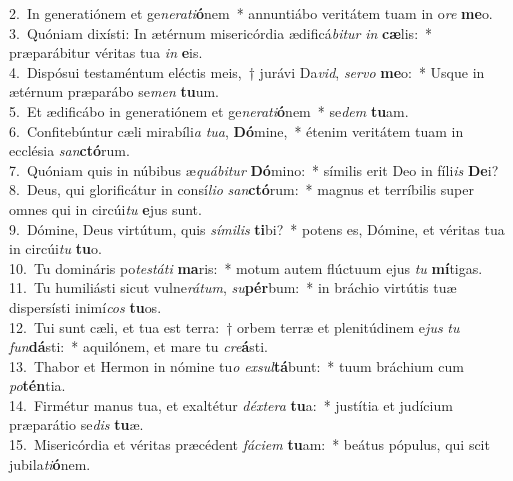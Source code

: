 {2.~}In generatiónem et ge\textit{ne}\textit{ra}\textit{ti}\textbf{ó}nem~* annuntiábo veritátem tuam in o\textit{re} \textbf{me}o.\\
{3.~}Quóniam dixísti: In ætérnum misericórdia ædificá\textit{bi}\textit{tur} \textit{in} \textbf{cæ}lis:~* præparábitur véritas tua \textit{in} \textbf{e}is.\\
{4.~}Dispósui testaméntum eléctis meis,~† jurávi Da\textit{vid}, \textit{ser}\textit{vo} \textbf{me}o:~* Usque in ætérnum præparábo se\textit{men} \textbf{tu}um.\\
{5.~}Et ædificábo in generatiónem et ge\textit{ne}\textit{ra}\textit{ti}\textbf{ó}nem~* se\textit{dem} \textbf{tu}am.\\
{6.~}Confitebúntur cæli mirabíli\textit{a} \textit{tu}\textit{a}, \textbf{Dó}mine,~* étenim veritátem tuam in ecclésia \textit{san}\textbf{ctó}rum.\\
{7.~}Quóniam quis in núbibus æ\textit{quá}\textit{bi}\textit{tur} \textbf{Dó}mino:~* símilis erit Deo in fíli\textit{is} \textbf{De}i?\\
{8.~}Deus, qui glorificátur in consí\textit{li}\textit{o} \textit{san}\textbf{ctó}rum:~* magnus et terríbilis super omnes qui in circúi\textit{tu} \textbf{e}jus sunt.\\
{9.~}Dómine, Deus virtútum, quis \textit{sí}\textit{mi}\textit{lis} \textbf{ti}bi?~* potens es, Dómine, et véritas tua in circúi\textit{tu} \textbf{tu}o.\\
{10.~}Tu domináris po\textit{te}\textit{stá}\textit{ti} \textbf{ma}ris:~* motum autem flúctuum ejus \textit{tu} \textbf{mí}tigas.\\
{11.~}Tu humiliásti sicut vulne\textit{rá}\textit{tum}, \textit{su}\textbf{pér}bum:~* in bráchio virtútis tuæ dispersísti inimí\textit{cos} \textbf{tu}os.\\
{12.~}Tui sunt cæli, et tua est terra:~† orbem terræ et plenitúdinem e\textit{jus} \textit{tu} \textit{fun}\textbf{dá}sti:~* aquilónem, et mare tu \textit{cre}\textbf{á}sti.\\
{13.~}Thabor et Hermon in nómine tu\textit{o} \textit{ex}\textit{sul}\textbf{tá}bunt:~* tuum bráchium cum \textit{po}\textbf{tén}tia.\\
{14.~}Firmétur manus tua, et exaltétur \textit{déx}\textit{te}\textit{ra} \textbf{tu}a:~* justítia et judícium præparátio se\textit{dis} \textbf{tu}æ.\\
{15.~}Misericórdia et véritas præcédent \textit{fá}\textit{ci}\textit{em} \textbf{tu}am:~* beátus pópulus, qui scit jubila\textit{ti}\textbf{ó}nem.\\
